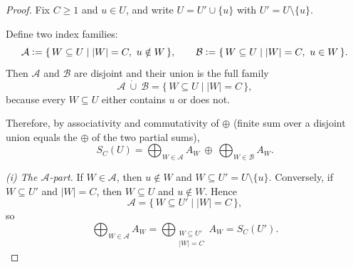 \begin{toappendix}
\begin{proof}
Fix $C\ge 1$ and $u\in U$, and write $U=U'\cup\{u\}$ with $U'=U\setminus\{u\}$.

Define two index families:
\[
\mathcal A\mathrel{\mathop:}=\{\,W\subseteq U \mid |W|=C,\ u\notin W\,\},
\qquad
\mathcal B\mathrel{\mathop:}=\{\,W\subseteq U \mid |W|=C,\ u\in W\,\}.
\]
Then $\mathcal A$ and $\mathcal B$ are disjoint and their union is the full family
\[
\mathcal A\ \dot\cup\ \mathcal B=\{\,W\subseteq U\mid |W|=C\,\},
\]
because every $W\subseteq U$ either contains $u$ or does not.

Therefore, by associativity and commutativity of $\oplus$ (finite sum over a disjoint
union equals the $\oplus$ of the two partial sums),
\begin{equation}\label{eq:split-SC}
S_C(U)
=
\bigoplus_{W\in\mathcal A} A_W\ \oplus\ \bigoplus_{W\in\mathcal B} A_W.
\end{equation}

\smallskip\noindent
\emph{(i) The $\mathcal A$-part.}
If $W\in\mathcal A$, then $u\notin W$ and $W\subseteq U'=U\setminus\{u\}$.
Conversely, if $W\subseteq U'$ and $|W|=C$, then $W\subseteq U$ and $u\notin W$.
Hence
\[
\mathcal A=\{\,W\subseteq U'\mid |W|=C\,\},
\]
so
\begin{equation}\label{eq:A-part}
\bigoplus_{W\in\mathcal A}A_W
=
\bigoplus_{\substack{W\subseteq U'\\|W|=C}}A_W
=
S_C(U').
\end{equation}


\end{proof}
\end{toappendix}
